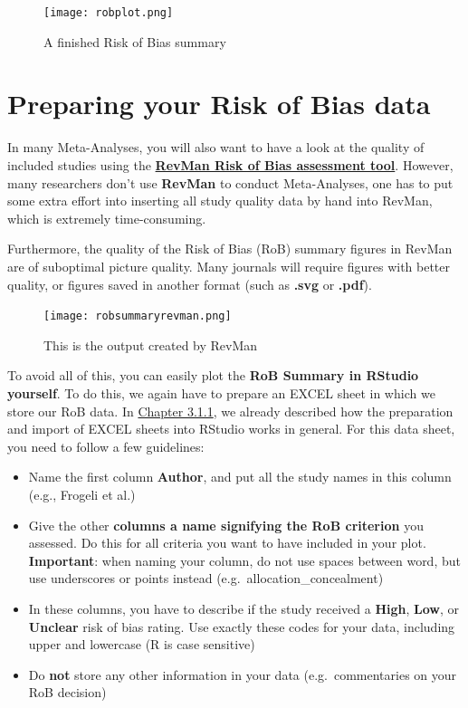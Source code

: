 \documentclass[]{book}
\providecommand{\tightlist}{%
  \setlength{\itemsep}{0pt}\setlength{\parskip}{0pt}}
\begin{document}
\begin{figure}
\centering
\texttt{[image: robplot.png]}
\caption{A finished Risk of Bias summary}
\end{figure}

\hypertarget{preparing-your-risk-of-bias-data}{%
\section{Preparing your Risk of Bias data}\label{preparing-your-risk-of-bias-data}}

In many Meta-Analyses, you will also want to have a look at the quality of included studies using the \href{https://handbook-5-1.cochrane.org/chapter_8/8_6_presentation_of_assessments_of_risk_of_bias.htm}{\textbf{RevMan Risk of Bias assessment tool}}. However, many researchers don't use \textbf{RevMan} to conduct Meta-Analyses, one has to put some extra effort into inserting all study quality data by hand into RevMan, which is extremely time-consuming.

Furthermore, the quality of the Risk of Bias (RoB) summary figures in RevMan are of suboptimal picture quality. Many journals will require figures with better quality, or figures saved in another format (such as \textbf{.svg} or \textbf{.pdf}).

\begin{figure}
\centering
\texttt{[image: robsummaryrevman.png]}
\caption{This is the output created by RevMan}
\end{figure}

To avoid all of this, you can easily plot the \textbf{RoB Summary in RStudio yourself}.
To do this, we again have to prepare an EXCEL sheet in which we store our RoB data. In \protect\hyperlink{excel_preparation}{Chapter 3.1.1}, we already described how the preparation and import of EXCEL sheets into RStudio works in general. For this data sheet, you need to follow a few guidelines:

\begin{itemize}
\tightlist
\item
  Name the first column \textbf{Author}, and put all the study names in this column (e.g., Frogeli et al.)
\item
  Give the other \textbf{columns a name signifying the RoB criterion} you assessed. Do this for all criteria you want to have included in your plot. \textbf{Important}: when naming your column, do not use spaces between word, but use underscores or points instead (e.g.~allocation\_concealment)
\item
  In these columns, you have to describe if the study received a \textbf{High}, \textbf{Low}, or \textbf{Unclear} risk of bias rating. Use exactly these codes for your data, including upper and lowercase (R is case sensitive)
\item
  Do \textbf{not} store any other information in your data (e.g.~commentaries on your RoB decision)
\end{itemize}
\end{document}
